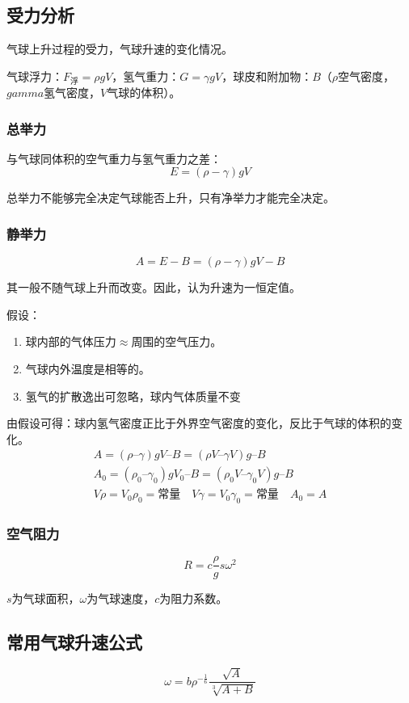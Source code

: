 \documentclass[UTF8,11pt]{ctexbook}
\begin{document}
\subsection{受力分析}

气球上升过程的受力，气球升速的变化情况。

气球浮力：\(F_\text{浮}=\rho gV\)，氢气重力：\(G=\gamma gV\)，球皮和附加物：\(B\)（\(\rho\)空气密度，\(gamma\)氢气密度，\(V\)气球的体积）。

\subsubsection{总举力}

与气球同体积的空气重力与氢气重力之差：
\[
E=(\rho-\gamma)gV
\]

总举力不能够完全决定气球能否上升，只有净举力才能完全决定。

\subsubsection{静举力}
\[
A=E-B=(\rho-\gamma)gV-B
\]

其一般不随气球上升而改变。因此，认为升速为一恒定值。

假设：
\begin{enumerate}
    \item 球内部的气体压力\(\approx\)周围的空气压力。
    \item 气球内外温度是相等的。
    \item 氢气的扩散逸出可忽略，球内气体质量不变
\end{enumerate}

由假设可得：球内氢气密度正比于外界空气密度的变化，反比于气球的体积的变化。
\begin{gather}
A=(\rho–\gamma)gV–B=(\rho V–\gamma V)g–B\\
A_0=(\rho_0–\gamma_0)gV_0–B=(\rho_0V–\gamma_0V)g–B\\
V\rho=V_0\rho_0=\text{常量}\quad V\gamma=V_0\gamma_0=\text{常量}\quad A_0=A
\end{gather}

\subsubsection{空气阻力}
\[
R=c\frac{\rho}{g}s\omega^2
\]

\(s\)为气球面积，\(\omega\)为气球速度，\(c\)为阻力系数。

\subsection{常用气球升速公式}
\[
\omega=b\rho^{-\frac16}\frac{\sqrt{A}}{\sqrt[3]{A+B}}
\]
\end{document}
